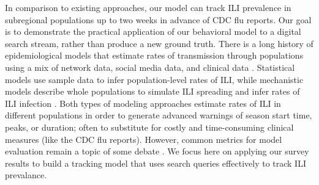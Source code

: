 \documentclass[fleqn,10pt]{wlscirep}
\begin{document}
In comparison to existing approaches, our model can track ILI prevalence in subregional populations up to two weeks in advance of CDC flu reports. Our goal is to demonstrate the practical application of our behavioral model to a digital search stream, rather than produce a new ground truth. There is a long history of epidemiological models that estimate rates of transmission through populations using a mix of network data, social media data, and clinical data \cite{ginsberg_etal_2009,culotta2010towards,bodnar2013validating,nsoesie2014guess,generous2014global,yang_etal_2015inference,yang_etal_2015,biggerstaff_etal_2016,zhang2017forecasting}. Statistical models use sample data to infer population-level rates of ILI, while mechanistic models describe whole populations to simulate ILI spreading and infer rates of ILI infection \cite{biggerstaff_etal_2016}. Both types of modeling approaches estimate rates of ILI in different populations in order to generate advanced warnings of season start time, peaks, or duration; often to substitute for costly and time-consuming clinical measures (like the CDC flu reports). However, common metrics for model evaluation remain a topic of some debate \cite{biggerstaff_etal_2016}. We focus here on applying our survey results to build a tracking model that uses search queries effectively to track ILI prevalance.


\end{document}
